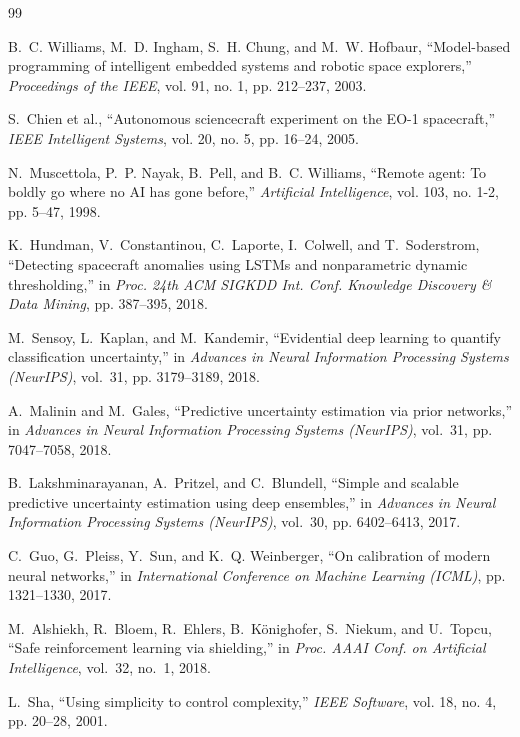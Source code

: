 \documentclass[10pt,twocolumn]{article}
\begin{document}
\begin{thebibliography}{99}

B.~C. Williams, M.~D. Ingham, S.~H. Chung, and M.~W. Hofbaur, ``Model-based programming of intelligent embedded systems and robotic space explorers,'' \emph{Proceedings of the IEEE}, vol. 91, no. 1, pp. 212--237, 2003.

S.~Chien et al., ``Autonomous sciencecraft experiment on the EO-1 spacecraft,'' \emph{IEEE Intelligent Systems}, vol. 20, no. 5, pp. 16--24, 2005.

N.~Muscettola, P.~P. Nayak, B.~Pell, and B.~C. Williams, ``Remote agent: To boldly go where no AI has gone before,'' \emph{Artificial Intelligence}, vol. 103, no. 1-2, pp. 5--47, 1998.

K.~Hundman, V.~Constantinou, C.~Laporte, I.~Colwell, and T.~Soderstrom, ``Detecting spacecraft anomalies using LSTMs and nonparametric dynamic thresholding,'' in \emph{Proc. 24th ACM SIGKDD Int. Conf. Knowledge Discovery \& Data Mining}, pp. 387--395, 2018.

M.~Sensoy, L.~Kaplan, and M.~Kandemir, ``Evidential deep learning to quantify classification uncertainty,'' in \emph{Advances in Neural Information Processing Systems (NeurIPS)}, vol.~31, pp. 3179--3189, 2018.

A.~Malinin and M.~Gales, ``Predictive uncertainty estimation via prior networks,'' in \emph{Advances in Neural Information Processing Systems (NeurIPS)}, vol.~31, pp. 7047--7058, 2018.

B.~Lakshminarayanan, A.~Pritzel, and C.~Blundell, ``Simple and scalable predictive uncertainty estimation using deep ensembles,'' in \emph{Advances in Neural Information Processing Systems (NeurIPS)}, vol.~30, pp. 6402--6413, 2017.

C.~Guo, G.~Pleiss, Y.~Sun, and K.~Q. Weinberger, ``On calibration of modern neural networks,'' in \emph{International Conference on Machine Learning (ICML)}, pp. 1321--1330, 2017.

M.~Alshiekh, R.~Bloem, R.~Ehlers, B.~K{\"o}nighofer, S.~Niekum, and U.~Topcu, ``Safe reinforcement learning via shielding,'' in \emph{Proc. AAAI Conf. on Artificial Intelligence}, vol.~32, no.~1, 2018.

L.~Sha, ``Using simplicity to control complexity,'' \emph{IEEE Software}, vol. 18, no. 4, pp. 20--28, 2001.


\end{thebibliography}
\end{document}
